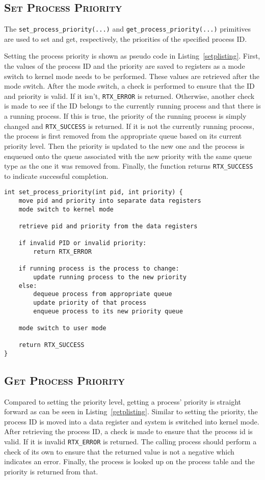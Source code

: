 \documentclass[oneside]{report}
\begin{document}
\subsection{\textsc{Set Process Priority}}
The \texttt{set\_process\_priority(...)} and \texttt{get\_process\_priority(...)}
primitives are used to set and get, respectively, the priorities of the 
specified process ID. 

Setting the process priority is shown as pseudo code in
Listing~\ref{setplisting}. First, the values of the process ID and the priority
are saved to registers as a mode switch to kernel mode needs to be performed.
These values are retrieved after the mode switch. After the mode switch, a
check is performed to ensure that the ID and priority is valid. If it isn't,
\texttt{RTX\_ERROR} is returned. Otherwise, another check is made to see if the
ID belongs to the currently running process and that there is a running
process. If this is true, the priority of the running process is simply changed 
and \texttt{RTX\_SUCCESS} is returned. If it is not the currently running 
process, the process is first removed from the appropriate queue based on its 
current priority level. Then the priority is updated to the new one and the 
process is enqueued onto the queue associated with the new priority with the 
same queue type as the one it was removed from. Finally, the function returns 
\texttt{RTX\_SUCCESS} to indicate successful completion.

\begin{lstlisting}
int set_process_priority(int pid, int priority) {
    move pid and priority into separate data registers
    mode switch to kernel mode
    
    retrieve pid and priority from the data registers

    if invalid PID or invalid priority:
        return RTX_ERROR
    
    if running process is the process to change:
        update running process to the new priority
    else:
        dequeue process from appropriate queue
        update priority of that process
        enqueue process to its new priority queue

    mode switch to user mode

    return RTX_SUCCESS
}
\end{lstlisting}

\subsection{\textsc{Get Process Priority}}
Compared to setting the priority level, getting a process' priority is straight
forward as can be seen in Listing~\ref{getplisting}. Similar to setting the
priority, the process ID is moved into a data register and system is switched 
into kernel mode. After retrieving the process ID, a check is made to ensure
that the process id is valid. If it is invalid \texttt{RTX\_ERROR} is returned.
The calling process should perform a check of its own to ensure that
the returned value is not a negative which indicates an error. Finally, the
process is looked up on the process table and the priority is returned from
that.
\end{document}
